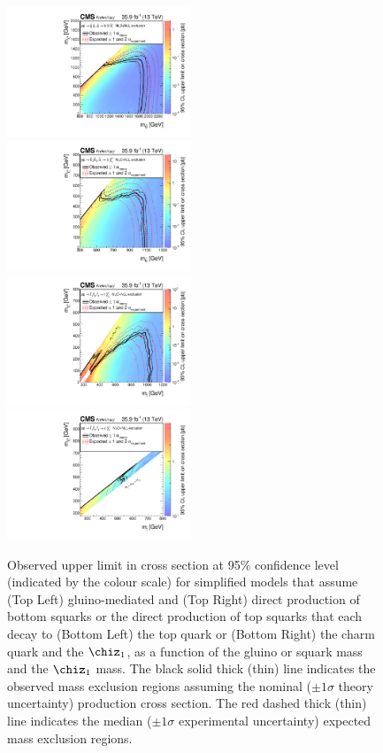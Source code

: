 \begin{figure}[!tb]
  \centering
  \includegraphics[width=0.49\textwidth]{T1bbbbXSEC.pdf} ~
  \includegraphics[width=0.49\textwidth]{T2bbXSEC.pdf} \\
  \includegraphics[width=0.49\textwidth]{T2ttXSEC.pdf} ~
  \includegraphics[width=0.49\textwidth]{T2ccXSEC.pdf} 
  \caption{Observed upper limit in cross section at 95\% confidence
    level (indicated by the colour scale) for simplified models that
    assume (Top Left) gluino-mediated and (Top Right) direct
    production of bottom squarks or the direct production of top
    squarks that each decay to (Bottom Left) the top quark or
    (Bottom Right) the charm quark and the $\chiz_{1}$, as a
    function of the gluino or squark mass and the $\chiz_{1}$ 
    mass. The black solid thick (thin) line indicates the observed
    mass exclusion regions assuming the nominal (${\pm}1 \sigma$
    theory uncertainty) production cross section. The red dashed
    thick (thin) line indicates the median (${\pm}1 \sigma$
    experimental uncertainty) expected mass exclusion
    regions. 
  }
  \label{fig:limits-sms} 
  \centering
\end{figure}


